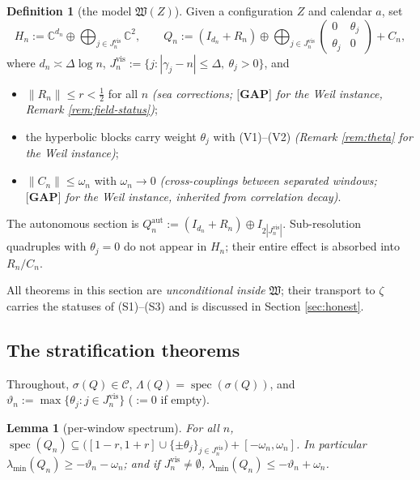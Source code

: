 \documentclass[11pt,reqno]{amsart}
\newtheorem{lemma}[theorem]{Lemma}
\theoremstyle{definition}
\newtheorem{definition}[theorem]{Definition}
\newcommand{\Cor}{\mathcal{C}}
\newcommand{\spec}{\operatorname{spec}}
\newcommand{\C}{\mathbb{C}}
\newcommand{\Qaut}{Q^{\mathrm{aut}}}
\newcommand{\half}{\tfrac12}
\newcommand{\GAP}{\textbf{[GAP]}}
\begin{document}
\begin{definition}[the model \(\mathfrak W(Z)\)]\label{def:model}
Given a configuration \(Z\) and calendar \(a\), set
\[
H_n:=\C^{d_n}\oplus\bigoplus_{j\in J_n^{\mathrm{vis}}}\C^2,\qquad
Q_n:=(I_{d_n}+R_n)\oplus\bigoplus_{j\in J_n^{\mathrm{vis}}}
\begin{pmatrix}0&\theta_j\\\theta_j&0\end{pmatrix}+C_n,
\]
where \(d_n\asymp\Delta\log n\),
\(J_n^{\mathrm{vis}}:=\{j:|\gamma_j-n|\leq\Delta,\ \theta_j>0\}\), and
\begin{itemize}
\item[\textup{(S1)}] \(\|R_n\|\leq r<\half\) for all \(n\) \emph{(sea
corrections; \(\GAP\) for the Weil instance, Remark \ref{rem:field-status})};
\item[\textup{(S2)}] the hyperbolic blocks carry weight \(\theta_j\) with
(V1)--(V2) \emph{(Remark \ref{rem:theta} for the Weil instance)};
\item[\textup{(S3)}] \(\|C_n\|\leq\omega_n\) with \(\omega_n\to0\)
\emph{(cross-couplings between separated windows; \(\GAP\) for the Weil
instance, inherited from correlation decay)}.
\end{itemize}
The autonomous section is \(\Qaut_n:=(I_{d_n}+R_n)\oplus
I_{2|J_n^{\mathrm{vis}}|}\). Sub-resolution quadruples with \(\theta_j=0\) do not
appear in \(H_n\); their entire effect is absorbed into \(R_n/C_n\).
\end{definition}

All theorems in this section are \emph{unconditional inside} \(\mathfrak W\);
their transport to \(\zeta\) carries the statuses of (S1)--(S3) and is discussed
in Section \ref{sec:honest}.

\subsection{The stratification theorems}
Throughout, \(\sigma(Q)\in\Cor\), \(\Lambda(Q)=\spec(\sigma(Q))\), and
\(\vartheta_n:=\max\{\theta_j:j\in J_n^{\mathrm{vis}}\}\) (\(:=0\) if empty).

\begin{lemma}[per-window spectrum]\label{lem:window-spec}
For all \(n\),
\(\spec(Q_n)\subseteq\bigl([1-r,1+r]\cup\{\pm\theta_j\}_{j\in J_n^{\mathrm{vis}}}
\bigr)+[-\omega_n,\omega_n]\). In particular
\(\lambda_{\min}(Q_n)\geq-\vartheta_n-\omega_n\); and if
\(J_n^{\mathrm{vis}}\neq\emptyset\),
\(\lambda_{\min}(Q_n)\leq-\vartheta_n+\omega_n\).
\end{lemma}
\end{document}
